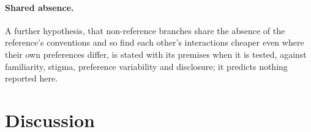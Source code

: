 
\paragraph{Shared absence.} A further hypothesis, that non-reference branches share the absence of the reference's conventions and so find each other's interactions cheaper even where their own preferences differ, is stated with its premises when it is tested, against familiarity, stigma, preference variability and disclosure; it predicts nothing reported here.

\section{Discussion}
\label{sec:discussion}

